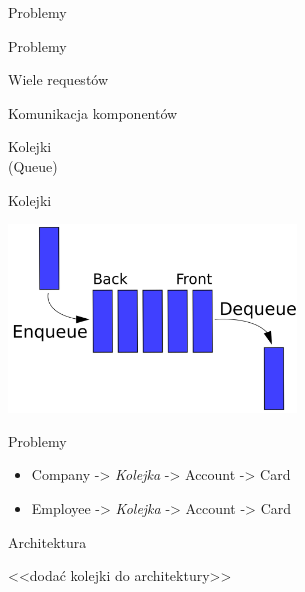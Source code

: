 \documentclass{beamer}
\begin{document}
\begin{frame}{}
	\begin{center}
		\Huge{Problemy}
	\end{center}
\end{frame}

\begin{frame}{Problemy}
	\begin{center}
		\Huge{Wiele requestów}
	\end{center}
\end{frame}

\begin{frame}{Komunikacja komponentów}
	\begin{center}
		\Huge{Kolejki}\\
		\huge{(Queue)}
	\end{center}
\end{frame}

\begin{frame}{Kolejki}
	\begin{center}
		\includegraphics[height=5cm]{queue1.png}
	\end{center}
\end{frame}

\begin{frame}{Problemy}
	\begin{huge}
		\begin{itemize}[<+->]
			\item Company -> \textit{Kolejka} -> Account -> Card
			\item Employee -> \textit{Kolejka} -> Account -> Card
		\end{itemize}
	\end{huge}
\end{frame}

\begin{frame}{Architektura}
	\begin{center}
		<<dodać kolejki do architektury>>
	\end{center}
\end{frame}
\end{document}
